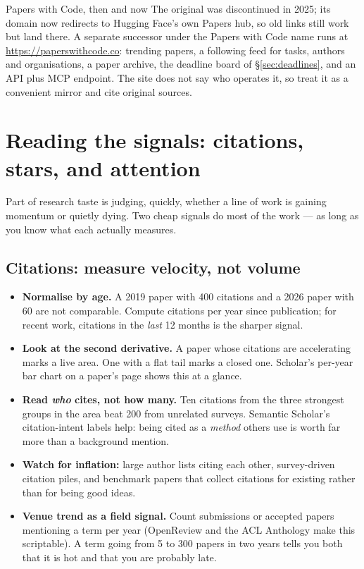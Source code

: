 \documentclass[11pt,a4paper]{article}
\begin{document}
\begin{cbox}{Papers with Code, then and now}
The original  was discontinued in 2025; its domain
now redirects to Hugging Face's own Papers hub, so old links still work but
land there. A separate successor under the Papers with Code name runs at
\url{https://paperswithcode.co}: trending papers, a following feed for tasks,
authors and organisations, a paper archive, the deadline board of
\S\ref{sec:deadlines}, and an API plus MCP endpoint. The site does not say who
operates it, so treat it as a convenient mirror and cite original sources.
\end{cbox}

\section{Reading the signals: citations, stars, and attention}
\label{sec:signals}

Part of research taste is judging, quickly, whether a line of work is gaining
momentum or quietly dying. Two cheap signals do most of the work --- as long as
you know what each actually measures.

\subsection{Citations: measure velocity, not volume}

\begin{itemize}
  \item \textbf{Normalise by age.} A 2019 paper with 400 citations and a 2026
        paper with 60 are not comparable. Compute citations per year since
        publication; for recent work, citations in the \emph{last} 12 months
        is the sharper signal.
  \item \textbf{Look at the second derivative.} A paper whose citations are
        accelerating marks a live area. One with a flat tail marks a closed
        one. Scholar's per-year bar chart on a paper's page shows this at a
        glance.
  \item \textbf{Read \emph{who} cites, not how many.} Ten citations from the
        three strongest groups in the area beat 200 from unrelated surveys.
        Semantic Scholar's citation-intent labels help: being cited as a
        \emph{method} others use is worth far more than a background mention.
  \item \textbf{Watch for inflation:} large author lists citing each other,
        survey-driven citation piles, and benchmark papers that collect
        citations for existing rather than for being good ideas.
  \item \textbf{Venue trend as a field signal.} Count submissions or accepted
        papers mentioning a term per year (OpenReview and the ACL Anthology
        make this scriptable). A term going from 5 to 300 papers in two years
        tells you both that it is hot and that you are probably late.
\end{itemize}
\end{document}

